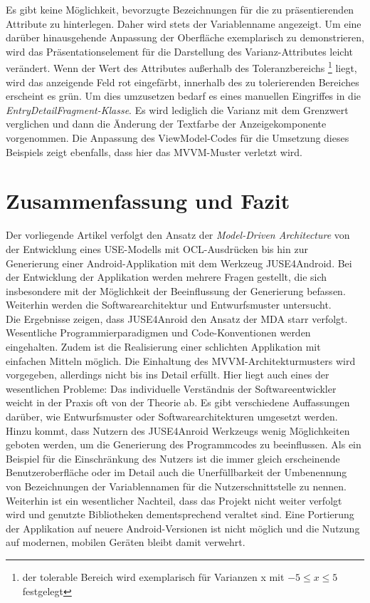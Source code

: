 \documentclass[a4paper,twoside]{article}
\begin{document}
Es gibt keine Möglichkeit, bevorzugte Bezeichnungen für die zu präsentierenden Attribute zu hinterlegen. Daher wird stets der Variablenname angezeigt. 
Um eine darüber hinausgehende Anpassung der Oberfläche exemplarisch zu demonstrieren, wird das Präsentationselement für die Darstellung des Varianz-Attributes leicht verändert. Wenn der Wert des Attributes außerhalb des Toleranzbereichs \footnote{der tolerable Bereich wird exemplarisch für Varianzen x mit \(-5 \le x \le 5\) festgelegt} liegt, wird das anzeigende Feld rot eingefärbt, innerhalb des zu tolerierenden Bereiches erscheint es grün. Um dies umzusetzen bedarf es eines manuellen Eingriffes in die \textit{EntryDetailFragment-Klasse}. Es wird lediglich die Varianz mit dem Grenzwert verglichen und dann die Änderung der Textfarbe der Anzeigekomponente vorgenommen. Die Anpassung des ViewModel-Codes für die Umsetzung dieses Beispiels zeigt ebenfalls, dass hier das MVVM-Muster verletzt wird.

\section{Zusammenfassung und Fazit}
Der vorliegende Artikel verfolgt den Ansatz der \textit{Model-Driven Architecture} von der Entwicklung eines USE-Modells mit OCL-Ausdrücken bis hin zur Generierung einer Android-Applikation mit dem Werkzeug JUSE4Android. Bei der Entwicklung der Applikation werden mehrere Fragen gestellt, die sich insbesondere mit der Möglichkeit der Beeinflussung der Generierung befassen. Weiterhin werden die Softwarearchitektur und Entwurfsmuster untersucht. 
\\

Die Ergebnisse zeigen, dass JUSE4Anroid den Ansatz der MDA starr verfolgt. Wesentliche Programmierparadigmen und Code-Konventionen werden eingehalten. Zudem ist die Realisierung einer schlichten Applikation mit einfachen Mitteln möglich. Die Einhaltung des MVVM-Architekturmusters wird vorgegeben, allerdings nicht bis ins Detail erfüllt. Hier liegt auch eines der wesentlichen Probleme: Das individuelle Verständnis der Softwareentwickler weicht in der Praxis oft von der Theorie ab. Es gibt verschiedene Auffassungen darüber, wie Entwurfsmuster oder Softwarearchitekturen umgesetzt werden. Hinzu kommt, dass Nutzern des JUSE4Anroid Werkzeugs wenig Möglichkeiten geboten werden, um die Generierung des Programmcodes zu beeinflussen. Als ein Beispiel für die Einschränkung des Nutzers ist die immer gleich erscheinende Benutzeroberfläche oder im Detail auch die Unerfüllbarkeit der Umbenennung von Bezeichnungen der Variablennamen für die Nutzerschnittstelle zu nennen. Weiterhin ist ein wesentlicher Nachteil, dass das Projekt nicht weiter verfolgt wird und genutzte Bibliotheken dementsprechend veraltet sind. Eine Portierung der Applikation auf neuere Android-Versionen ist nicht möglich und die Nutzung auf modernen, mobilen Geräten bleibt damit verwehrt.
\\
\end{document}
